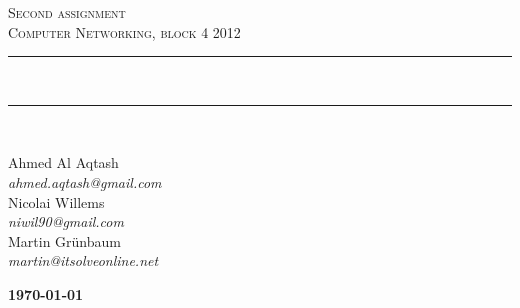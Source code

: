 \documentclass[10pt]{article}
\newcommand{\HRule}{\rule{\linewidth}{0.5mm}}
\begin{document}
\begin{titlepage}

\begin{center}



\textsc{\LARGE Second assignment}\\[1.5cm]

\textsc{\Large Computer Networking, block 4 2012}\\[0.5cm]


\HRule \\[0.4cm]



\HRule \\ [7.5cm]


\begin{minipage}{0.5\textwidth}
\begin{flushleft} \large
Ahmed Al Aqtash \\
\textit{ahmed.aqtash@gmail.com}\\
Nicolai Willems \\
\textit{niwil90@gmail.com}\\
Martin Grünbaum \\
\textit{martin@itsolveonline.net}\\
\end{flushleft}
\end{minipage}
\begin{minipage}{0.4\textwidth}
\begin{flushright} \large
\textbf{\today} \\
\end{flushright}
\end{minipage}

\vfill



\end{center}

\end{titlepage}
\newpage
\tableofcontents
\newpage




\end{document}
